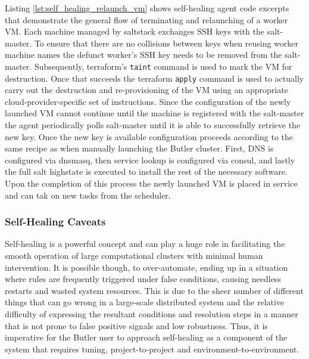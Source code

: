 Listing \ref{lst:self_healing_relaunch_vm} shows self-healing agent code excerpts that demonstrate the general flow of terminating and relaunching of a worker VM. Each machine managed by saltstack exchanges SSH keys with the salt-master. To ensure that there are no collisions between keys when reusing worker machine names the defunct worker's SSH key needs to be removed from the salt-master. Subsequently, terraform's \texttt{taint} command is used to mark the VM for destruction. Once that succeeds the terraform \texttt{apply} command is used to actually carry out the destruction and re-provisioning of the VM using an appropriate cloud-provider-specific set of instructions. Since the configuration of the newly launched VM cannot continue until the machine is registered with the salt-master the agent periodically polls salt-master until it is able to successfully retrieve the new key. Once the new key is available configuration proceeds according to the same recipe as when manually launching the Butler cluster. First, DNS is configured via dnsmasq, then service lookup is configured via consul, and lastly the full salt highstate is executed to install the rest of the necessary software. Upon the completion of this process the newly launched VM is placed in service and can tak on new tasks from the scheduler.

\subsubsection{Self-Healing Caveats}

Self-healing is a powerful concept and can play a huge role in facilitating the smooth operation of large computational clusters with minimal human intervention. It is possible though, to over-automate, ending up in a situation where rules are frequently triggered under false conditions, causing needless restarts and wasted system resources. This is due to the sheer number of different things that can go wrong in a large-scale distributed system and the relative difficulty of expressing the resultant conditions and resolution steps in a manner that is not prone to false positive signals and low robustness. Thus, it is imperative for the Butler user to approach self-healing as a component of the system that requires tuning, project-to-project and environment-to-environment. 

